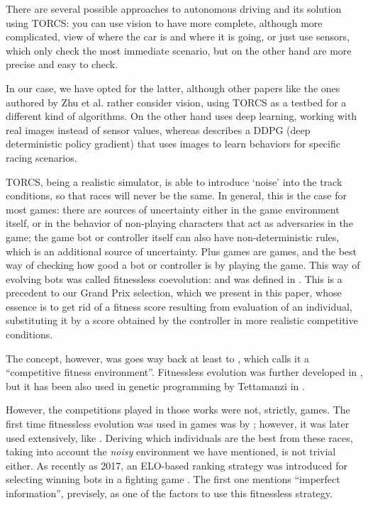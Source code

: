 \documentclass[10pt,journal,compsoc]{IEEEtran}
\begin{document}
There are several possible approaches to autonomous driving and its
solution using TORCS: you can use vision to have more complete,
although more complicated, view of where the car is and where it is
going, or just use sensors, which only check the most immediate
scenario, but on the other hand are more precise and easy to check. 

In our case, we have opted for the latter, although other papers like the
ones authored by Zhu et al. \cite{zhu2018driving,zhu2019vision,neurone} rather
consider vision, using TORCS as a testbed for a different kind of
algorithms. On the other hand \cite{8833873} uses deep learning, working with real images instead of sensor values, whereas \cite{Kaushik_2018_ECCV_Workshops} describes a DDPG (deep deterministic policy gradient) that uses images to learn behaviors for specific racing scenarios.

TORCS, being a realistic simulator, is able to introduce `noise' into
the track conditions, so that races will never be the same. In
general, this is the case for most games: there are sources of
uncertainty either in the game environment itself, or in the behavior
of non-playing characters that act as adversaries in the game; the
game bot or controller itself can also have non-deterministic rules,
which is an additional source of uncertainty. Plus games are games,
and the best way of checking how good a bot or controller is by
playing the game. This way of evolving bots was called fitnessless
coevolution: and was defined in
\cite{Jaskowski:2008:FC:1389095.1389161}. This is a precedent to our
Grand Prix selection, which we present in this paper, whose essence is
to get rid of a fitness score resulting from evaluation of an
individual, substituting it by a score obtained by the controller in
more realistic competitive conditions.

The concept, however, was goes way back at least to
\cite{Angeline:1993:CEE:645513.657590}, which calls it a ``competitive
fitness environment''. Fitnessless evolution was further developed in
\cite{rosin1995methods}, but it has been also used in genetic
programming by Tettamanzi in \cite{tettamanzi1996genetic}.

However, the competitions played in those works were not, strictly,
games. The first time fitnessless evolution was used in  games was by
\cite{luke1998genetic}; however, it was later used extensively, like
\cite{Jaskowski2008,10.1007/978-3-540-78671-9_2,alhejali2011using,DBLP:conf/evoW/Fernandez-AresG16}. Deriving which individuals are the best from these races, taking into account
the {\em noisy} environment we have mentioned, is not trivial
either. As recently as 2017, an ELO-based ranking strategy was
introduced for selecting winning bots in a fighting game
\cite{7792145}. The first one mentions ``imperfect information'',
previsely, as one of the factors to use this fitnessless strategy.
\end{document}
